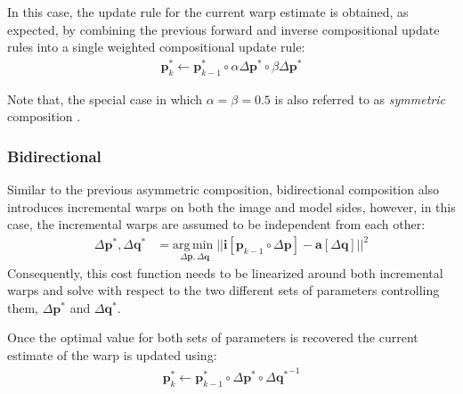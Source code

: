 In this case, the update rule for the current warp estimate is obtained, as expected, by combining the previous forward and inverse compositional update rules into a single weighted compositional update rule:
\begin{equation}
 	\begin{aligned}
    	\mathbf{p}_k^* \leftarrow \mathbf{p}_{k-1}^* \circ \alpha \Delta \mathbf{p}^* \circ \beta \Delta \mathbf{p}^* 
    \label{eq:ac_update}
    \end{aligned}
\end{equation}

Note that, the special case in which $\alpha = \beta = 0.5$ is also referred to as \emph{symmetric} composition \cite{Megret2008, Autheserre2009, Megret2010}.

\subsubsection{Bidirectional}
\label{sec:bidirectional}

Similar to the previous asymmetric composition, bidirectional composition also introduces incremental warps on both the image and model sides, however, in this case, the incremental warps are assumed to be independent from each other:
\begin{equation}
    \begin{aligned}
        \Delta \mathbf{p}^*, \Delta \mathbf{q}^*  & = \underset{\Delta \mathbf{p}, \Delta \mathbf{q}} {\mathrm{arg\, min\;}} || \mathbf{i}[\mathbf{p}_{k-1} \circ \Delta \mathbf{p}] - \mathbf{a} [\Delta \mathbf{q}] ||^2
    \label{eq:ssd_bc}
    \end{aligned}
\end{equation}
Consequently, this cost function needs to be linearized around both incremental warps and solve with respect to the two different sets of parameters controlling them, $\Delta \mathbf{p}^*$ and $\Delta \mathbf{q}^*$. 

Once the optimal value for both sets of parameters is recovered the current estimate of the warp is updated using:
\begin{equation}
 	\begin{aligned}
    	\mathbf{p}_k^* \leftarrow \mathbf{p}_{k-1}^* \circ \Delta \mathbf{p}^* \circ \Delta {\mathbf{q}^*}^{-1} 
    \label{eq:bc_update}
    \end{aligned}
\end{equation}

